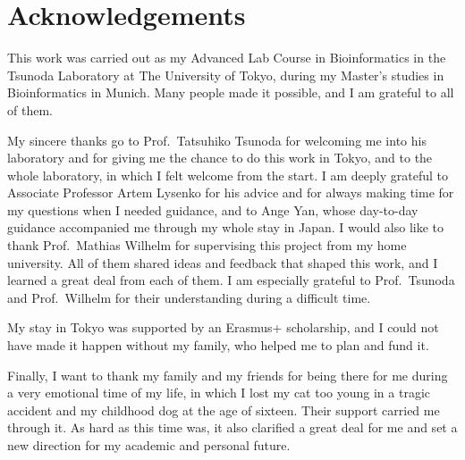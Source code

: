\chapter*{Acknowledgements}

This work was carried out as my Advanced Lab Course in Bioinformatics in the Tsunoda Laboratory at
The University of Tokyo, during my Master's studies in Bioinformatics in Munich. Many people made it possible, and I am grateful to all of them.

My sincere thanks go to Prof.\ Tatsuhiko Tsunoda for welcoming me into his laboratory and for giving
me the chance to do this work in Tokyo, and to the whole laboratory, in which I felt welcome from the start. I am deeply grateful to Associate Professor Artem Lysenko for
his advice and for always making time for my questions when I needed guidance, and to Ange Yan, whose
day-to-day guidance accompanied me through my whole stay in Japan. I would also like to thank
Prof.\ Mathias Wilhelm for supervising this project from my home university. All of them shared ideas
and feedback that shaped this work, and I learned a great deal from each of them. I am especially
grateful to Prof.\ Tsunoda and Prof.\ Wilhelm for their understanding during a difficult time.

My stay in Tokyo was supported by an Erasmus+ scholarship, and I could not have made it happen without
my family, who helped me to plan and fund it.

Finally, I want to thank my family and my friends for being there for me during a very emotional time
of my life, in which I lost my cat too young in a tragic accident and my childhood dog at the age of
sixteen. Their support carried me through it. As hard as this time was, it also clarified a great deal
for me and set a new direction for my academic and personal future.
